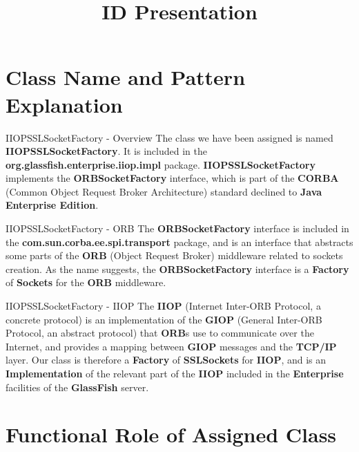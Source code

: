 \documentclass{../common/latex_classes/pdf_presentation}
\title{ID Presentation}
\begin{document}
	\titleToc{}
		\section{Class Name and Pattern Explanation}
		
		\begin{frame}{IIOPSSLSocketFactory - Overview}
			The class we have been assigned is named \textbf{IIOPSSLSocketFactory}.
			It is included in the \textbf{org.glassfish.enterprise.iiop.impl} package.
			\textbf{IIOPSSLSocketFactory} implements the \textbf{ORBSocketFactory} interface, which is part of the \textbf{CORBA} (Common Object Request Broker Architecture) standard declined to \textbf{Java Enterprise Edition}.
		\end{frame}
		
		\begin{frame}{IIOPSSLSocketFactory - ORB}
			The \textbf{ORBSocketFactory} interface is included in the \textbf{com.sun.corba.ee.spi.transport} package, and is an interface that abstracts some parts of the \textbf{ORB} (Object Request Broker) middleware related to sockets creation.
			As the name suggests, the \textbf{ORBSocketFactory} interface is a \textbf{Factory} of \textbf{Sockets} for the \textbf{ORB} middleware.
		\end{frame}
		
		\begin{frame}{IIOPSSLSocketFactory - IIOP}
			The \textbf{IIOP} (Internet Inter-ORB Protocol, a concrete protocol) is an implementation of the \textbf{GIOP} (General Inter-ORB Protocol, an abstract protocol) that \textbf{ORB}s use to communicate over the Internet, and provides a mapping between \textbf{GIOP} messages and the \textbf{TCP/IP} layer.
			Our class is therefore a \textbf{Factory} of \textbf{SSLSockets} for \textbf{IIOP}, and is an \textbf{Implementation} of the relevant part of the \textbf{IIOP} included in the \textbf{Enterprise} facilities of the \textbf{GlassFish} server.
		\end{frame}
		
		\section{Functional Role of Assigned Class}
		
\end{document}
